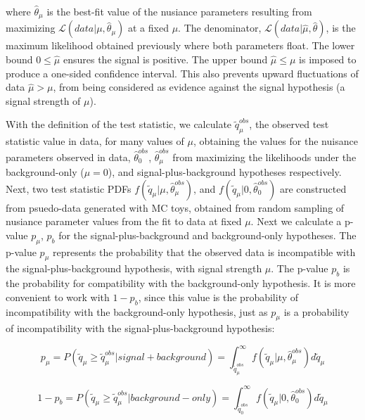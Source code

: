 \noindent where $\hat{\theta}_{\mu}$ is the best-fit value of the nusiance parameters resulting from maximizing $\mathcal{L}(data|\mu,\hat{\theta}_{\mu})$ at a fixed $\mu$. 
The denominator, $\mathcal{L}(data|\hat{\mu},\hat{\theta})$, is the maximum likelihood obtained
previously where both parameters float. The lower bound $0 \leq \hat{\mu}$ ensures the signal is positive.
The upper bound $\hat{\mu} \leq \mu$ is imposed to produce a one-sided confidence interval. This also prevents upward fluctuations of data $\hat{\mu} > \mu$, 
from being considered as evidence against the signal hypothesis (a signal strength of $\mu$).

With the definition of the test statistic, we calculate $\tilde{q}_{\mu}^{obs}$, the observed test statistic value in data,
for many values of $\mu$, obtaining the values for the nuisance parameters observed in data, $\hat{\theta}_{0}^{obs}$, $\hat{\theta}_{\mu}^{obs}$
from maximizing the likelihoods under the background-only ($\mu=0$), and signal-plus-background hypotheses respectively.
Next, two test statistic PDFs
$f(\tilde{q}_{\mu}|\mu,\hat{\theta}_{\mu}^{obs})$, and $f(\tilde{q}_{\mu}|0,\hat{\theta}_{0}^{obs})$ are constructed from psuedo-data
generated with MC toys, obtained from random sampling of nusiance parameter values from the fit to data at fixed $\mu$.  Next we calculate a p-value $p_{\mu}$, $p_{b}$
for the signal-plus-background and background-only hypotheses. The p-value $p_{\mu}$ represents the probability that the observed data is incompatible with the
signal-plus-background hypothesis, with signal strength $\mu$.
The p-value $p_{b}$ is the probability for compatibility with the background-only hypothesis.
It is more convenient to work with $1-p_{b}$, since this value is the probability of incompatibility with the background-only hypothesis,
just as $p_{\mu}$ is a probability of incompatibility with the signal-plus-background hypothesis:

\begin{equation}
\label{eqn:pvalues1}
p_{\mu} = P(\tilde{q}_{\mu} \geq \tilde{q}_{\mu}^{obs}|signal+background) = \int_{\tilde{q}_{\mu}^{obs}}^{\infty} f(\tilde{q}_{\mu}|\mu,\hat{\theta}_{\mu}^{obs}) d\tilde{q}_{\mu}
\end{equation}

\begin{equation}
\label{eqn:pvalues2}
1- p_{b} = P(\tilde{q}_{\mu} \geq \tilde{q}_{\mu}^{obs}|background-only) = \int_{\tilde{q}_{0}^{obs}}^{\infty} f(\tilde{q}_{\mu}|0,\hat{\theta}_{0}^{obs}) d\tilde{q}_{\mu}
\end{equation}

